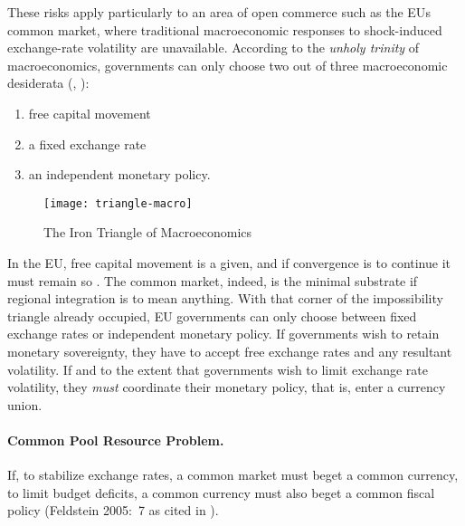 These risks apply particularly to an area of open commerce such as the \gls{EU}s common market, where traditional macroeconomic responses to shock-induced exchange-rate volatility are unavailable.
According to the \emph{unholy trinity} of macroeconomics, governments can only choose two out of three macroeconomic desiderata (\citealt{Mundell1963}, \citealt{Fleming1962}):
\begin{enumerate}
	\item free capital movement
	\item a fixed exchange rate
	\item an independent monetary policy.
\end{enumerate}

 \begin{figure}[htbp]
	\centering
	\texttt{[image: triangle-macro]}
	\caption{The Iron Triangle of Macroeconomics}
	\label{fig:triangle-macro}
\end{figure}

In the \gls{EU}, free capital movement is a given, and if convergence is to continue it must remain so \citep{Abiad2007}.
The common market, indeed, is the minimal substrate if regional integration is to mean anything.
With that corner of the impossibility triangle already occupied, \gls{EU} governments can only choose between fixed exchange rates or independent monetary policy.
If governments wish to retain monetary sovereignty, they have to accept free exchange rates and any resultant volatility.
If and to the extent that governments wish to limit exchange rate volatility, they \emph{must} coordinate their monetary policy, that is, enter a currency union.

\paragraph[Fiscal-CPR]{Common Pool Resource Problem.}  \label{sec:Fiscal-CPR} If, to stabilize exchange rates, a common market must beget a common currency, to limit budget deficits, a common currency must also beget a common fiscal policy (Feldstein 2005:~7 as cited in \citealt[13]{Begg2008}).

